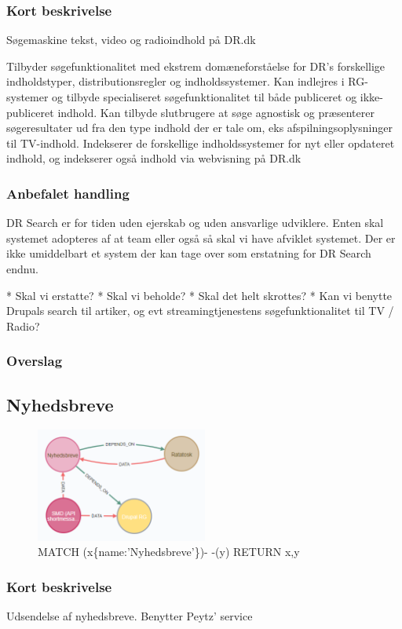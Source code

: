 \documentclass{article}
\begin{document}
\subsubsection{Kort beskrivelse}
Søgemaskine tekst, video og radioindhold på DR.dk	

Tilbyder søgefunktionalitet med ekstrem domæneforståelse for DR's forskellige indholdstyper, distributionsregler og indholdssystemer. Kan indlejres i RG-systemer og tilbyde specialiseret søgefunktionalitet til både publiceret og ikke-publiceret indhold. Kan tilbyde slutbrugere at søge agnostisk og præsenterer søgeresultater ud fra den type indhold der er tale om, eks afspilningsoplysninger til TV-indhold. Indekserer de forskellige indholdssystemer for nyt eller opdateret indhold, og indekserer også indhold via webvisning på DR.dk
\subsubsection{Anbefalet handling}
DR Search er for tiden uden ejerskab og uden ansvarlige udviklere. Enten skal systemet adopteres af at team eller også så skal vi have afviklet systemet. Der er ikke umiddelbart et system der kan tage over som erstatning for DR Search endnu. 

* Skal vi erstatte?
* Skal vi beholde?
* Skal det helt skrottes?
* Kan vi benytte Drupals search til artiker, og evt streamingtjenestens søgefunktionalitet til TV / Radio?
\subsubsection{Overslag}


\subsection{Nyhedsbreve}
\begin{figure}[h]
\includegraphics[width=160pt]{Nyhedsbreve.PNG}
\caption{MATCH (x\{name:'Nyhedsbreve'\})- -(y) RETURN x,y}
\end{figure}
\subsubsection{Kort beskrivelse}
Udsendelse af nyhedsbreve. Benytter Peytz' service	
\end{document}
